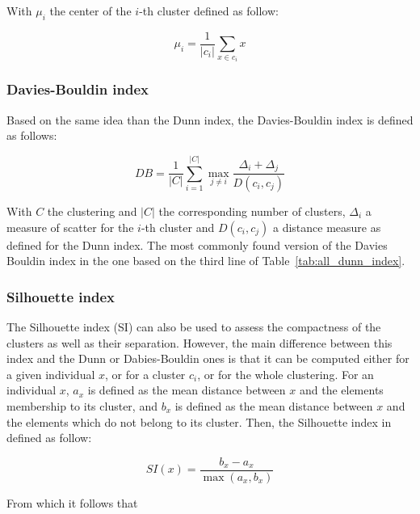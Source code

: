     \vspace{0.8cm}

    With $\mu_i$ the center of the $i$-th cluster defined as follow:

    \begin{equation}
        \mu_i = \frac{1}{|c_i|}\sum_{x \in c_i}x
        \label{eq:mui}
    \end{equation}

    \subsubsection{Davies-Bouldin index}
    Based on the same idea than the Dunn index, the Davies-Bouldin index is defined as follows:

    \begin{equation}
DB = \frac{1}{|C|}\sum_{i=1}^{|C|} \max_{j \neq i} \frac{\Delta_i + \Delta_j}{D(c_i,c_j)}
        \label{eq:db_index}
    \end{equation}

    With $C$ the clustering and $|C|$ the corresponding number of clusters, $\Delta_i$ a measure of scatter for the $i$-th cluster and $D(c_i, c_j)$ a distance measure as defined for the Dunn index. The most commonly found version of the Davies Bouldin index in the one based on the third line of Table~\ref{tab:all_dunn_index}.

    \subsubsection{Silhouette index}
    The Silhouette index (SI) can also be used to assess the compactness of the 
    clusters as well as their separation. However, the main difference between 
    this index and the Dunn or Dabies-Bouldin ones is that it can be computed 
    either for a given individual $x$, or for a cluster $c_i$, or for the whole 
    clustering. For an individual $x$, $a_x$ is defined as the mean distance 
    between $x$ and the elements membership to its cluster, and $b_x$ is defined 
    as the mean distance between $x$ and the elements which do not belong to its 
    cluster. Then, the Silhouette index in defined as follow:

    \begin{equation}
        SI(x) = \frac{b_x - a_x}{\max(a_x, b_x)}
        \label{eq:si_x}
    \end{equation}

    From which it follows that 

